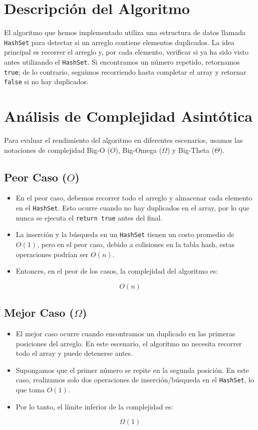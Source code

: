 \documentclass{article}
\begin{document}
	\newpage
	
	
	
	\section{Descripción del Algoritmo}
	El algoritmo que hemos implementado utiliza una estructura de datos llamada \texttt{HashSet} para detectar si un arreglo contiene elementos duplicados. La idea principal es recorrer el arreglo y, por cada elemento, verificar si ya ha sido visto antes utilizando el \texttt{HashSet}. Si encontramos un número repetido, retornamos \texttt{true}; de lo contrario, seguimos recorriendo hasta completar el array y retornar \texttt{false} si no hay duplicados.
	
	\section{Análisis de Complejidad Asintótica}
	Para evaluar el rendimiento del algoritmo en diferentes escenarios, usamos las notaciones de complejidad Big-O ($O$), Big-Omega ($\Omega$) y Big-Theta ($\Theta$).
	
	\subsection{Peor Caso ($O$)}
	\begin{itemize}
		\item En el peor caso, debemos recorrer todo el arreglo y almacenar cada elemento en el \texttt{HashSet}. Esto ocurre cuando no hay duplicados en el array, por lo que nunca se ejecuta el \texttt{return true} antes del final.
		\item La inserción y la búsqueda en un \texttt{HashSet} tienen un costo promedio de $O(1)$, pero en el peor caso, debido a colisiones en la tabla hash, estas operaciones podrían ser $O(n)$.
		\item Entonces, en el peor de los casos, la complejidad del algoritmo es:
	\end{itemize}
	\begin{equation}
		O(n)
	\end{equation}
	
	\subsection{Mejor Caso ($\Omega$)}
	\begin{itemize}
		\item El mejor caso ocurre cuando encontramos un duplicado en las primeras posiciones del arreglo. En este escenario, el algoritmo no necesita recorrer todo el array y puede detenerse antes.
		\item Supongamos que el primer número se repite en la segunda posición. En este caso, realizamos solo dos operaciones de inserción/búsqueda en el \texttt{HashSet}, lo que toma $O(1)$.
		\item Por lo tanto, el límite inferior de la complejidad es:
	\end{itemize}
	\begin{equation}
		\Omega(1)
	\end{equation}
	
\end{document}
